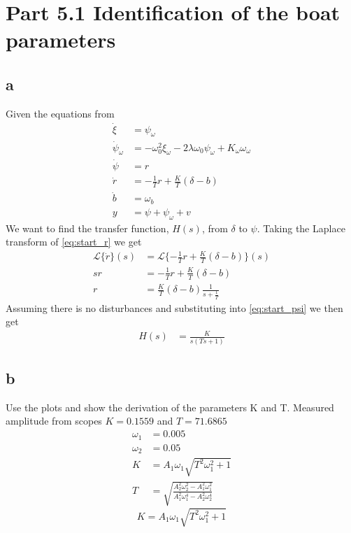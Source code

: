 \section{Part 5.1 Identification of the boat parameters}
\subsection{a}
Given the equations from 
\begin{subequations}
\begin{align}
    \dot{\xi} &= \psi_\omega\\
    \dot{\psi}_\omega &= -\omega^2_0 \xi_\omega - 2 \lambda \omega_0 \psi_\omega + K_\omega \omega_\omega\\
    \dot{\psi} &= r\\ \label{eq:start_psi}
    \dot{r} &= -\frac{1}{T} r + \frac{K}{T} (\delta-b)\\ \label{eq:start_r}
    \dot{b} &= \omega_b\\
    y &= \psi + \psi_\omega + v
\end{align}
\end{subequations}
We want to find the transfer function, $H(s)$, from $\delta$ to $\psi$. Taking the Laplace transform of \cref{eq:start_r} we get 
\begin{align*}
    \mathcal{L}\{\dot{r}\}(s) &= \mathcal{L}\{{-\frac{1}{T} r + \frac{K}{T}
    (\delta - b)}\}(s)\\
    s r&=-\frac{1}{T} r + \frac{K}{T}(\delta - b)\\
    r &= \frac{K}{T}(\delta-b) \frac{1}{s+\frac{1}{T}}
\end{align*}
Assuming there is no disturbances and substituting into  \cref{eq:start_psi} we then get
\begin{align}
    H(s) &= \frac{K}{s(Ts+1)}
\end{align}
\subsection{b}
Use the plots and show the derivation of the parameters K and T. Measured amplitude from scopes
$K = 0.1559$ and $T = 71.6865$
\begin{align*}
    \omega_1 &= 0.005\\
    \omega_2 &= 0.05\\
    K &= A_1\omega_1\sqrt{T^2\omega_1^2+1}\\
    T &= \sqrt{\frac{A_2^2\omega_2^2-A_1^2\omega_1^2}{A_1^2\omega_1^4-A_2^2\omega_2^4}}
\end{align*}
$$K = A_1\omega_1\sqrt{T^2\omega_1^2+1}$$

